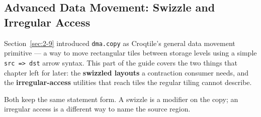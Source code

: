 \subsection*{Advanced Data Movement: Swizzle and Irregular Access}

Section~\ref{sec:2-9} introduced \texttt{dma.copy} as Croqtile's general data movement primitive --- a way to move rectangular tiles between storage levels using a simple \texttt{src =\textgreater{} dst} arrow syntax. This part of the guide covers the two things that chapter left for later: the \textbf{swizzled layouts} a contraction consumer needs, and the \textbf{irregular-access} utilities that reach tiles the regular tiling cannot describe.

Both keep the same statement form. A swizzle is a modifier on the copy; an irregular access is a different way to name the source region.
